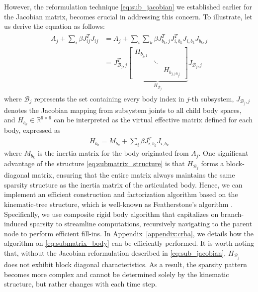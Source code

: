 \documentclass[lettersize,journal]{IEEEtran}
\begin{document}
However, the reformulation technique \eqref{eq:sub_jacobian} we established earlier for the Jacobian matrix, becomes crucial in addressing this concern.
To illustrate, let us derive the equation as follows:
\begin{align} \label{eq:submatrix_structure}
\begin{split}
A_j + \sum_{i} \beta J_{ij}^TJ_{ij} 
&= A_j + \sum_{i} \sum_k \beta J_{b_k,j}^TJ_{i,b_k}^TJ_{i,b_k}J_{b_k,j}  \\
&= J_{\mathcal{B}_j,j}^T 
\underbrace{\begin{bmatrix}
H_{b_{j,1}} & & \\
& \ddots & \\
& & H_{b_{j,\vert \mathcal{B}_j \vert }}
\end{bmatrix}}_{H_{\mathcal{B}_j}}
J_{\mathcal{B}_j,j} 
\end{split}
\end{align}
where $\mathcal{B}_j$ represents the set containing every body index in $j$-th subsystem, $J_{\mathcal{B}_j,j}$ denotes the Jacobian mapping from subsystem joints to all child body spaces, and $H_{b_k}\in\mathbb{R}^{6\times 6}$ can be interpreted as the virtual effective matrix defined for each body, expressed as
\begin{align} \label{eq:submatrix_body}
H_{b_k} = M_{b_k} + \sum_i \beta J_{i,b_k}^TJ_{i,b_k}
\end{align}
where $M_{b_k}$ is the inertia matrix for the body originated from $A_j$.
One significant advantage of the structure \eqref{eq:submatrix_structure} is that $H_{\mathcal{B}_j}$ forms a block-diagonal matrix, ensuring that the entire matrix always maintains the same sparsity structure as the inertia matrix of the articulated body.
Hence, we can implement an efficient construction and factorization algorithm based on the kinematic-tree structure, which is well-known as Featherstone's algorithm \cite{featherstone2014rigid}. 
Specifically, we use composite rigid body algorithm \cite{featherstone2014rigid} that capitalizes on branch-induced sparsity to streamline computations, recursively navigating to the parent node to perform efficient fill-ins.
In Appendix~\ref{appendix:crba}, we details how the algorithm on \eqref{eq:submatrix_body} can be efficiently performed.
It is worth noting that, without the Jacobian reformulation described in \eqref{eq:sub_jacobian}, $H_{\mathcal{B}_j}$ does not exhibit block diagonal characteristics. As a result, the sparsity pattern becomes more complex and cannot be determined solely by the kinematic structure, but rather changes with each time step.
\end{document}

